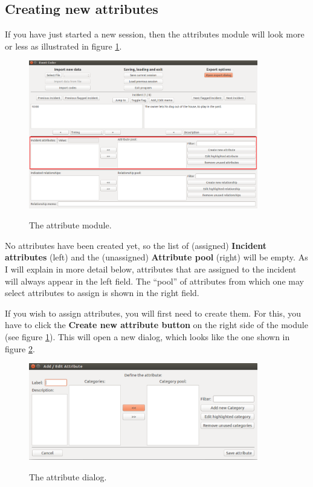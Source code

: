 \documentclass{memoir}
\begin{document}
\subsection{Creating new attributes}
\label{sec:creatingnewattributes}

If you have just started a new session, then the attributes module will look more or less as illustrated in figure \ref{fig:attributemodule}.

\begin{figure}[h!]
  \centering
  \caption{The attribute module.}
  \includegraphics[width=100mm]{Screenshot_7.pdf}
  \label{fig:attributemodule}
\end{figure}

No attributes have been created yet, so the list of (assigned) \textbf{Incident attributes} (left) and the (unassigned) \textbf{Attribute pool} (right) will be empty. As I will explain in more detail below, attributes that are assigned to the incident will always appear in the left field. The ``pool'' of attributes from which one may select attributes to assign is shown in the right field.

If you wish to assign attributes, you will first need to create them. For this, you have to click the \textbf{Create new attribute button} on the right side of the module (see figure \ref{fig:attributemodule}). This will open a new dialog, which looks like the one shown in figure \ref{fig:attributedialog}.

\begin{figure}[h!]
  \centering
  \caption{The attribute dialog.}
  \includegraphics[width=100mm]{Screenshot_8.pdf}
  \label{fig:attributedialog}
\end{figure}
\end{document}
